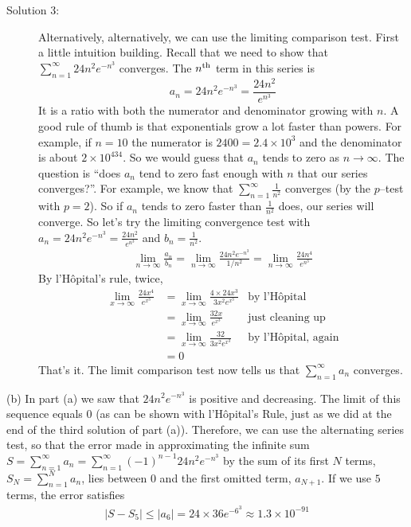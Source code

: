 \begin{solution}
\begin{description}
\item[Solution 3:]
Alternatively, alternatively, we can use the limiting comparison test.
First a little intuition building. Recall that we need to show that
$\sum\limits_{n=1}^\infty 24n^2 e^{-n^3}$ converges. The $n^{\rm th}$
term in this series is
\begin{equation*}
a_n = 24n^2 e^{-n^3} =\frac{24 n^2}{e^{n^3}}
\end{equation*}
It is a ratio with both the numerator and denominator growing with $n$.
A good rule of thumb is that exponentials grow a lot faster than powers.
For example, if $n=10$ the numerator is $2400=2.4\times 10^3$
and the denominator is about $2\times 10^{434}$.
So we would guess that $a_n$ tends to zero as $n\rightarrow\infty$.
The question is ``does $a_n$ tend to zero fast enough with $n$ that our series converges?''. For example, we know that $\sum_{n=1}^\infty \frac{1}{n^2}$
converges (by the $p$--test with $p=2$). So if $a_n$ tends to zero faster
than $\frac{1}{n^2}$ does, our series will converge. So let's try the limiting convergence test with $a_n = 24n^2 e^{-n^3} =\frac{24 n^2}{e^{n^3}}$
and $b_n=\frac{1}{n^2}$.
\begin{align*}
\lim_{n\rightarrow\infty}\frac{a_n}{b_n}
=\lim_{n\rightarrow\infty}\frac{24n^2 e^{-n^3}}{1/n^2}
=\lim_{n\rightarrow\infty}\frac{24n^4 }{e^{n^3}}
\end{align*}
By l'H\^opital's rule, twice,
\begin{align*}
\lim_{x\rightarrow\infty} \frac{24x^4 }{e^{x^3}}
&=\lim_{x\rightarrow\infty} \frac{4\times 24x^3 }{3 x^2e^{x^3}}
&\text{by l'H\^opital} \\
&=\lim_{x\rightarrow\infty} \frac{32x }{e^{x^3}}
&\text{just cleaning up} \\
&=\lim_{x\rightarrow\infty} \frac{32 }{3x^2e^{x^3}}
&\text{by l'H\^opital, again} \\
&=0
\end{align*}
That's it. The limit comparison test now tells us that
$\sum_{n=1}^\infty a_n$ converges.

\end{description}

\noindent (b)
In part (a) we saw that $24n^2 e^{-n^3}$ is positive and decreasing.
The limit of this sequence equals $0$ (as can be shown with l'H\^opital's
Rule, just as we did at the end of the third solution of part (a)). Therefore, we can
use the alternating series test, so that the
error made in approximating the infinite sum
$S= \sum\limits_{n=1}^\infty a_n
= \sum\limits_{n=1}^\infty  (-1)^{n-1} 24n^2 e^{-n^3}$ by the sum of its first $N$ terms,
$S_N=\sum\limits_{n=1}^N a_n$,  lies between $0$
and the first omitted term, $a_{N+1}$.
If we use $5$ terms, the error satisfies
\begin{align*}
   |S - S_5 | \le |a_6| = 24 \times 36 e^{-6^3}\approx 1.3 \times 10^{-91}
\end{align*}



\end{solution}

